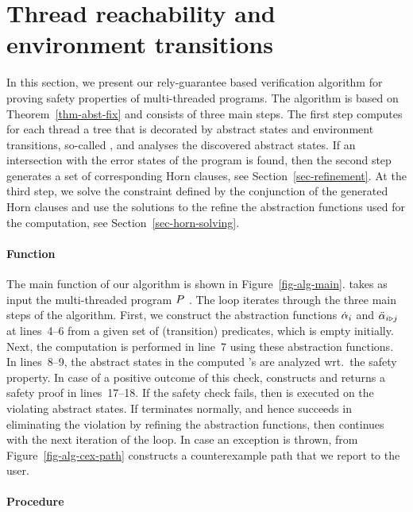 \section{Thread reachability and environment transitions}
\label{sec-algo-safety}

In this section, we present our rely-guarantee based verification
algorithm for proving safety properties of multi-threaded programs.
The algorithm is based on Theorem~\ref{thm-abst-fix} and consists of
three  main steps.
The first step computes for each thread a tree that is decorated by
abstract states and environment transitions, so-called \aret, and
analyses the discovered abstract states.
If an intersection with the error states of the program is found, then
the second step generates a set of corresponding Horn clauses, see
Section~\ref{sec-refinement}.
At the third step, we solve the constraint defined by the conjunction
of the generated Horn clauses and use the solutions to the refine the
abstraction functions used for the \aret computation, see
Section~\ref{sec-horn-solving}. 



\paragraph{Function \algMain}

The main function of our algorithm \algMain is shown in
Figure~\ref{fig-alg-main}.
\algMain takes as input the multi-threaded program $P\ $.
The \algRepeat loop iterates through the three main steps of the
algorithm.
First, we construct the abstraction functions $\dot{\alpha}_i$ and
$\ddot{\alpha}_{i\triangleright j}$ at lines~4--6 from a given set of
(transition) predicates, which is empty initially.
Next, the \aret computation is performed in line~7 using these
abstraction functions.
In lines~8--9, the abstract states in the computed \aret's are
analyzed wrt.\ the safety property.
In case of a positive outcome of this check, \algMain constructs and
returns a safety proof in lines~17--18.
If the safety check fails, then \algRefine is executed on the
violating abstract states.
If \algRefine terminates normally, and hence succeeds in eliminating
the violation by refining the abstraction functions, then \algMain
continues with the next iteration of the \algRepeat loop.
In case an \algUnsolvable exception is thrown, \algCexPath from
Figure~\ref{fig-alg-cex-path} constructs a counterexample path that we
report to the user.

\paragraph{Procedure \algAbstReachEnvSolve}


